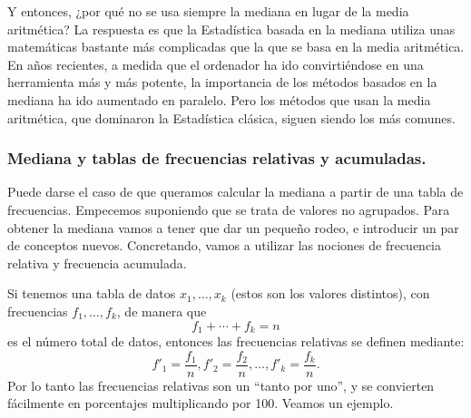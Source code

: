 Y entonces, ¿por qué no se usa siempre la mediana en lugar de la media aritmética? La respuesta es que la Estadística basada en la mediana utiliza unas matemáticas bastante más complicadas que la que se basa en la media aritmética. En años recientes, a medida que el ordenador ha ido convirtiéndose en una herramienta más y más potente, la importancia  de los métodos basados en la mediana ha ido aumentado en paralelo. Pero los métodos que usan la media aritmética, que dominaron la Estadística clásica, siguen siendo los más comunes.

\subsubsection{Mediana y tablas de frecuencias relativas y acumuladas.}
\label{cap02:subsubsec:MedianaTablasFrecuenciasRelativasAcumuladas}

Puede darse el caso de que queramos calcular la mediana a partir de una tabla de
frecuencias. Empecemos suponiendo que se trata de valores no agrupados. Para obtener la mediana vamos a tener que dar un pequeño rodeo, e introducir un par de conceptos nuevos.
Concretando, vamos a utilizar las nociones de frecuencia relativa y frecuencia acumulada.

Si tenemos una tabla de datos $x_1,\ldots,x_k$ (estos son los valores distintos), con frecuencias $f_1,\ldots,f_k$, de manera que
\[f_1+\cdots+f_k=n\]
es el número total de datos, entonces las {\sf frecuencias relativas} se definen mediante:
\[f'_1=\dfrac{f_1}{n},f'_2=\dfrac{f_2}{n},\ldots,f'_k=\dfrac{f_k}{n}.\]
Por lo tanto las frecuencias relativas son un ``tanto por uno'', y se convierten fácilmente en porcentajes multiplicando por 100. Veamos un ejemplo.


